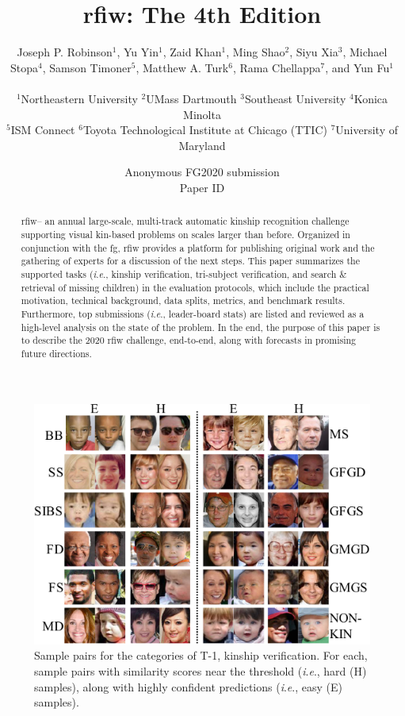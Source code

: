\documentclass[letterpaper, 10 pt, conference]{ieeeconf}
\title{\LARGE \bf
\ac{rfiw}: The 4th Edition
}
\author{\parbox{16cm}{\centering
    {\large Joseph P. Robinson$^1$, Yu Yin$^1$, Zaid Khan$^1$, Ming Shao$^2$,  Siyu Xia$^3$, Michael Stopa$^4$, Samson Timoner$^5$, Matthew A. Turk$^6$, Rama Chellappa$^7$, and Yun Fu$^1$}\\
    {\normalsize
    $^1$Northeastern University $^2$UMass Dartmouth $^3$Southeast University $^4$Konica Minolta \\
   $^5$ISM Connect $^6$Toyota Technological Institute at Chicago (TTIC) $^7$University of Maryland
    
    }
    }
}
\newcommand{\ie}{\textit{i}.\textit{e}., }
\begin{document}
\ifFGfinal
\thispagestyle{empty}
\pagestyle{empty}
\else
\author{Anonymous FG2020 submission\\ Paper ID \FGPaperID \\}
\pagestyle{plain}
\fi
\maketitle

\acresetall

\begin{abstract}
\ac{rfiw}-- an annual large-scale, multi-track automatic kinship recognition challenge supporting visual kin-based problems on scales larger than before. Organized in conjunction with the \ac{fg}, \ac{rfiw} provides a platform for publishing original work and the gathering of experts for a discussion of the next steps. This paper summarizes the supported tasks (\ie kinship verification, tri-subject verification, and search \& retrieval of missing children) in the evaluation protocols, which include the practical motivation, technical background, data splits, metrics, and benchmark results. Furthermore, top submissions (\ie leader-board stats) are listed and reviewed as a high-level analysis on the state of the problem. In the end, the purpose of this paper is to describe the 2020 \ac{rfiw} challenge, end-to-end, along with forecasts in promising future directions.

\end{abstract}
\hypersetup{citecolor=blue}
\acresetall
\glsresetall

\begin{figure}[t!]
    \centering
    \includegraphics[width =.9\linewidth]{figures/track1-samples-crop.pdf}
    \caption{Sample pairs for the categories of T-1, kinship verification. For each, sample pairs with similarity scores near the threshold (\ie hard (H) samples), along with highly confident predictions (\ie easy (E) samples).}
    \label{fig:track1:samples}
\end{figure}
\end{document}

